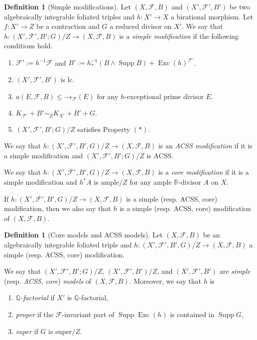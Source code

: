 \documentclass[11pt]{amsart}
\numberwithin{equation}{section}
\newcommand{\Qq}{\mathbb{Q}}
\newcommand{\Rr}{\mathbb{R}}
\newcommand{\Exc}{\operatorname{Exc}}
\newcommand{\Supp}{\operatorname{Supp}}
\newcommand{\Ff}{\mathcal{F}}
\theoremstyle{definition}
\newtheorem{defn}[thm]{Definition}
\theoremstyle{definition}
\theoremstyle{definition}
\begin{document}
\begin{defn}[Simple modifications]\label{defn: simple model}
    Let $(X,\Ff,B)$ and $(X',\Ff',B')$ be two algebraically integrable foliated triples and $h: X'\rightarrow X$ a birational morphism. Let $f: X'\rightarrow Z$ be a contraction and $G$ a reduced divisor on $X'$. We say that $h: (X',\Ff',B';G)/Z\rightarrow (X,\Ff,B)$ is a \emph{simple modification} if the following conditions hold.
    \begin{enumerate}
        \item $\Ff':=h^{-1}\Ff$ and $B':=h^{-1}_*(B\wedge\Supp B)+\Exc(h)^{\Ff'}$. 
        \item $(X',\Ff',B')$ is lc.
        \item  $a(E,\Ff,B)\leq-\epsilon_{\Ff}(E)$ for any $h$-exceptional prime divisor $E$. 
        \item $K_{\Ff'}+B'\sim_ZK_{X'}+B'+G.$
        \item $(X',\Ff',B';G)/Z$ satisfies Property $(*)$.
    \end{enumerate}
    
    We say that $h: (X',\Ff',B',G)/Z\rightarrow (X,\Ff,B)$ is an \emph{ACSS modification} if it is a simple modification and  $(X',\Ff',B';G)/Z$ is ACSS.

    We say that $h: (X',\Ff',B',G)/Z\rightarrow (X,\Ff,B)$ is a \emph{core modification} if it is a simple modification and $h^*A$ is ample$/Z$ for any ample $\Rr$-divisor $A$ on $X$. 

    If $h: (X',\Ff',B',G)/Z\rightarrow (X,\Ff,B)$ is a simple (resp. ACSS, core) modification, then we also say that $h$ is a simple (resp. ACSS, core) modification of $(X,\Ff,B)$.
\end{defn}

\begin{defn}[Core models and ACSS models]\label{defn: core model}
Let $(X,\Ff,B)$ be an algebraically integrable foliated triple and $h: (X',\Ff',B',G)/Z\rightarrow (X,\Ff,B)$ a simple (resp. ACSS, core) modification. 

We say that $(X',\Ff',B';G)/Z$, $(X',\Ff',B')/Z$, and $(X',\Ff',B')$ are \emph{simple} (resp. \emph{ACSS, core}) \emph{models} of $(X,\Ff,B)$. Moreover, we say that $h$ is
\begin{enumerate}
\item \emph{$\Qq$-factorial} if $X'$ is $\Qq$-factorial,
\item \emph{proper} if the $\Ff$-invariant part of $\Supp\Exc(h)$ is contained in $\Supp G$,
\item \emph{super} if $G$ is super$/Z$.
\end{enumerate}
\end{defn}
\end{document}
